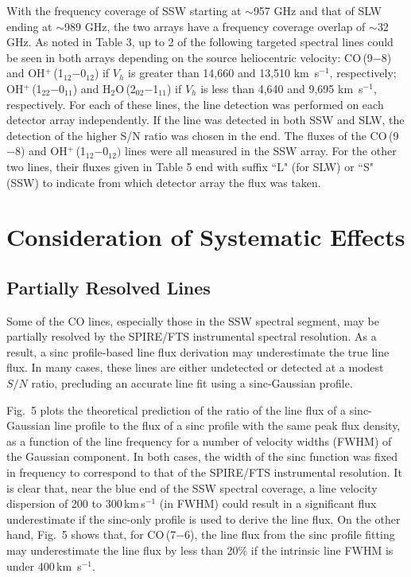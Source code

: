\documentclass[preprint]{aastex}
\newcommand{\kms}{\mbox{\,km~s$^{-1}$}}
\begin{document}
With the frequency coverage of SSW starting at $\sim$957 GHz and that of SLW ending at $\sim$989
GHz, the two arrays have a frequency coverage overlap of $\sim$32 GHz.  As noted in Table 3, up to 2
of the following targeted spectral lines could be seen in both arrays depending on the source 
heliocentric velocity: CO\,(9$-$8) and OH$^+$\,(1$_{12}$$-$0$_{12}$) if $V_h$ is greater than 
14,660 and 13,510\,\kms, respectively; OH$^+$\,(1$_{22}$$-$0$_{11}$) and H$_2$O\,(2$_{02}$$-$1$_{11}$) 
if $V_h$ is less than 4,640 and 9,695\,\kms, respectively.  For each of these lines, the line
detection was performed on each detector array independently.  If the line was detected in 
both SSW and SLW, the detection of the higher S/N ratio was chosen in the end.  The fluxes 
of the CO\,(9$-$8) and OH$^+$\,(1$_{12}$$-$0$_{12})$ lines were all measured in the SSW array.
For the other two lines, their fluxes given in Table 5 end with suffix ``L" (for SLW) or ``S" 
(SSW) to indicate from which detector array the flux was taken.






\section{Consideration of Systematic Effects} \label{sec4}


\subsection{Partially Resolved Lines} \label{sec4.1}


Some of the CO lines, especially those in the SSW spectral segment, may be partially 
resolved by the SPIRE/FTS instrumental spectral resolution.  As a result, a sinc profile-based 
line flux derivation may underestimate the true line flux.  In many cases, these lines 
are either undetected or detected at a modest $S/N$ ratio, precluding an accurate line 
fit using a sinc-Gaussian profile.


Fig.~5 plots the theoretical prediction of the ratio of the line flux of a sinc-Gaussian 
line profile to the flux of a sinc profile with the same peak flux density, as a function 
of the line frequency for a number of velocity widths (FWHM) of the Gaussian component. 
In both cases, the width of the sinc function was fixed in frequency to correspond to that 
of the SPIRE/FTS instrumental resolution.  It is clear that, near the blue end of the SSW 
spectral coverage, a line velocity dispersion of 200 to 300\,km\,s$^{-1}$ (in FWHM) could 
result in a significant flux underestimate if the sinc-only profile is used to derive 
the line flux.  On the other hand, Fig.~5 shows that, for CO\,(7$-$6), the line flux from
the sinc profile fitting may underestimate the line flux by less than 20\% if the intrinsic
line FWHM is under 400\kms.
 
\end{document}
